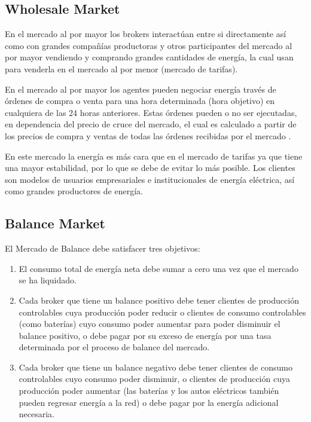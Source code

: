 \subsection{Wholesale Market}

En el mercado al por mayor los brokers interactúan entre si directamente así como con grandes compañías productoras y otros participantes del mercado al por mayor vendiendo y comprando grandes cantidades de energía, la cual usan para venderla en el mercado al por menor (mercado de tarifas). 

En el mercado al por mayor los agentes pueden negociar energía través de órdenes de compra o venta para una hora determinada (hora objetivo) en cualquiera de las 24 horas anteriores. Estas órdenes pueden o no ser ejecutadas, en dependencia del precio de cruce del mercado, el cual es calculado a partir de los precios de compra y ventas de todas las órdenes recibidas por el mercado \cite{WKetterJCollinsyMdWeerdtThe2016PowerTAC}.

En este mercado la energía es más cara que en el mercado de tarifas ya que tiene una mayor estabilidad, por lo que se debe de evitar lo más posible. Los clientes son modelos de usuarios empresariales e institucionales de energía eléctrica, así como grandes productores de energía.

\subsection{Balance Market}

El Mercado de Balance debe satisfacer tres objetivos:
\begin{enumerate}
	\item El consumo total de energía neta debe sumar a cero una vez que el mercado se ha liquidado.     
	\item Cada broker que tiene un balance positivo debe tener clientes de producción controlables cuya producción poder reducir o clientes de consumo controlables (como baterías) cuyo consumo poder aumentar para poder disminuir el balance positivo, o debe pagar por su exceso de energía por una tasa determinada por el proceso de balance del mercado.
	\item Cada broker que tiene un balance negativo debe tener clientes de consumo controlables cuyo consumo poder disminuir, o clientes de producción cuya producción poder aumentar (las baterías y los autos eléctricos también pueden regresar energía a la red) o debe pagar por la energía adicional necesaria.
\end{enumerate}

